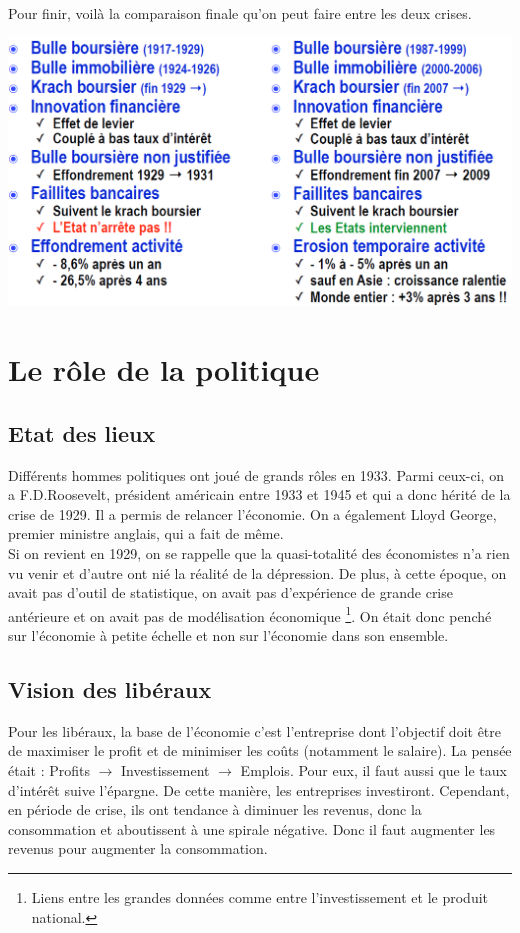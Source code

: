 \ \\

Pour finir, voilà la comparaison finale qu'on peut faire entre les deux crises. 

\begin{center}
	\includegraphics[scale=0.5]{51}
\end{center}

\section{Le rôle de la politique}
\subsection{Etat des lieux}
Différents hommes politiques ont joué de grands rôles en 1933. Parmi ceux-ci, on a F.D.Roosevelt, président américain entre 1933 et 1945 et qui a donc hérité de la crise de 1929. Il a permis de relancer l'économie. On a également Lloyd George, premier ministre anglais, qui a fait de même. \\
Si on revient en 1929, on se rappelle que la quasi-totalité des économistes n'a rien vu venir et d'autre ont nié la réalité de la dépression. De plus, à cette époque, on avait pas d'outil de statistique, on avait pas d'expérience de grande crise antérieure et on avait pas de modélisation économique \footnote{Liens entre les grandes données comme entre l'investissement et le produit national.}. On était donc penché sur l'économie à petite échelle et non sur l'économie dans son ensemble.

\subsection{Vision des libéraux}
Pour les libéraux, la base de l'économie c'est l'entreprise dont l'objectif doit être de maximiser le profit et de minimiser les coûts (notamment le salaire). La pensée était : Profits $\rightarrow$ Investissement $\rightarrow$ Emplois. Pour eux, il faut aussi que le taux d'intérêt suive l'épargne. De cette manière, les entreprises investiront. Cependant, en période de crise, ils ont tendance à diminuer les revenus, donc la consommation et aboutissent à une spirale négative. Donc il faut augmenter les revenus pour augmenter la consommation. 

